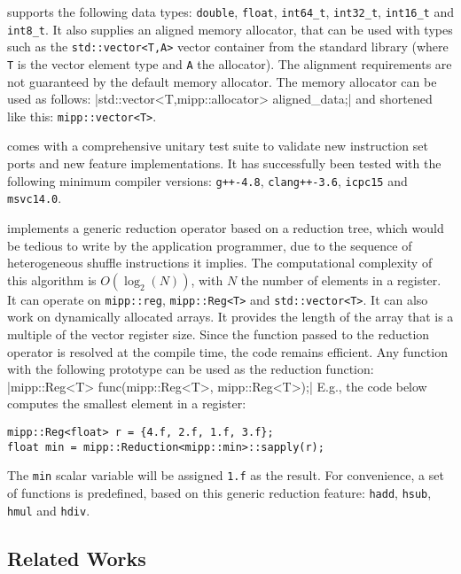 \MIPP supports the following data types: \verb|double|, \verb|float|,
\verb|int64_t|, \verb|int32_t|, \verb|int16_t| and \verb|int8_t|. It also
supplies an aligned memory allocator, that can be used with types such as the
\verb|std::vector<T,A>| vector container from the \Cxx standard library (where
\verb|T| is the vector element type and \verb|A| the allocator). The alignment
requirements are not guaranteed by the default \Cxx memory allocator. The \MIPP
memory allocator can be used as follows:
|std::vector<T,mipp::allocator> aligned_data;|
{\noindent
and shortened like this: \verb|mipp::vector<T>|.
}

\MIPP comes with a comprehensive unitary test suite to validate new instruction
set ports and new feature implementations. It has successfully been tested with
the following minimum compiler versions: \verb|g++-4.8|, \verb|clang++-3.6|,
\verb|icpc15| and \verb|msvc14.0|.

\MIPP implements a generic reduction operator based on a reduction tree, which
would be tedious to write by the application programmer, due to the sequence of
heterogeneous shuffle instructions it implies. The computational complexity of
this algorithm is $O(\log_2(N))$, with $N$ the number of elements in a register.
It can operate on \verb|mipp::reg|, \verb|mipp::Reg<T>| and
\verb|std::vector<T>|. It can also work on dynamically allocated arrays. It
provides the length of the array that is a multiple of the vector register size.
Since the function passed to the reduction operator is resolved at the compile
time, the code remains efficient. Any function with the following prototype can
be used as the reduction function:
|mipp::Reg<T> func(mipp::Reg<T>, mipp::Reg<T>);|
{\noindent
E.g., the code below computes the smallest element in a register:
}
\begin{verbatim}
mipp::Reg<float> r = {4.f, 2.f, 1.f, 3.f};
float min = mipp::Reduction<mipp::min>::sapply(r);
\end{verbatim}
The \verb|min| scalar variable will be assigned \verb|1.f| as the result. For
convenience, a set of functions is predefined, based on this generic reduction
feature: \verb|hadd|, \verb|hsub|, \verb|hmul| and \verb|hdiv|.

\subsection{Related Works}

